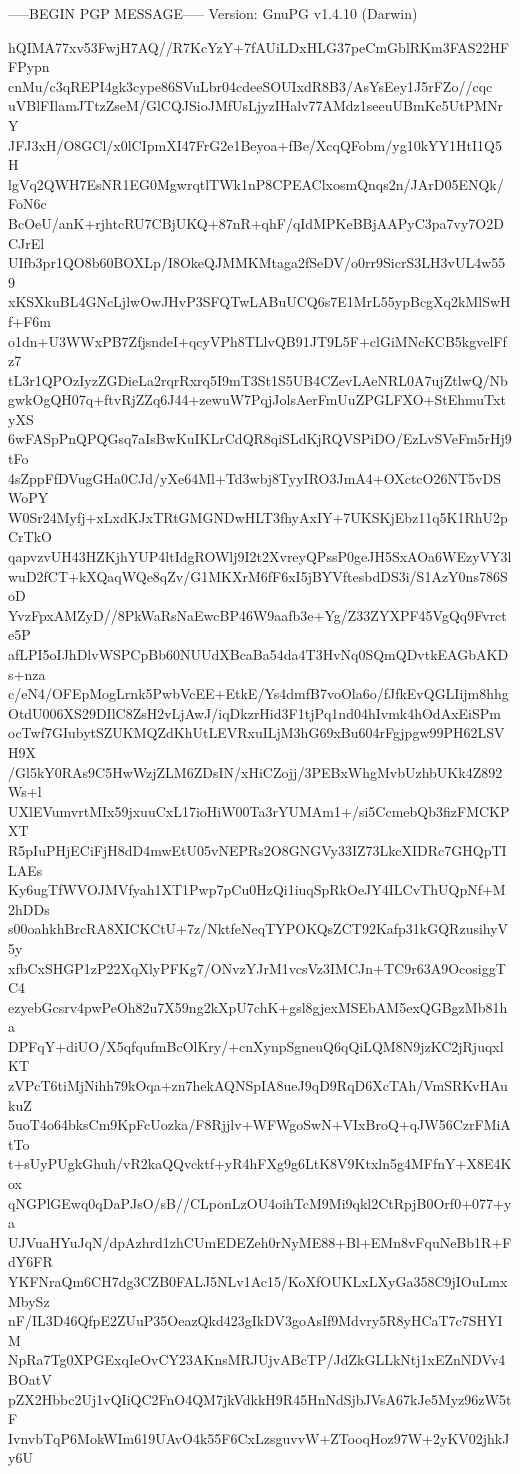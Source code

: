 -----BEGIN PGP MESSAGE-----
Version: GnuPG v1.4.10 (Darwin)

hQIMA77xv53FwjH7AQ//R7KcYzY+7fAUiLDxHLG37peCmGblRKm3FAS22HFFPypn
cnMu/c3qREPI4gk3cype86SVuLbr04cdeeSOUIxdR8B3/AsYsEey1J5rFZo//cqc
uVBlFIlamJTtzZseM/GlCQJSioJMfUsLjyzIHalv77AMdz1seeuUBmKc5UtPMNrY
JFJ3xH/O8GCl/x0lCIpmXI47FrG2e1Beyoa+fBe/XcqQFobm/yg10kYY1HtI1Q5H
lgVq2QWH7EsNR1EG0MgwrqtlTWk1nP8CPEAClxosmQnqs2n/JArD05ENQk/FoN6c
BcOeU/anK+rjhtcRU7CBjUKQ+87nR+qhF/qIdMPKeBBjAAPyC3pa7vy7O2DCJrEl
UIfb3pr1QO8b60BOXLp/I8OkeQJMMKMtaga2fSeDV/o0rr9SicrS3LH3vUL4w559
xKSXkuBL4GNcLjlwOwJHvP3SFQTwLABuUCQ6s7E1MrL55ypBcgXq2kMlSwHf+F6m
o1dn+U3WWxPB7ZfjsndeI+qcyVPh8TLlvQB91JT9L5F+clGiMNcKCB5kgvelFfz7
tL3r1QPOzIyzZGDieLa2rqrRxrq5I9mT3St1S5UB4CZevLAeNRL0A7ujZtlwQ/Nb
gwkOgQH07q+ftvRjZZq6J44+zewuW7PqjJolsAerFmUuZPGLFXO+StEhmuTxtyXS
6wFASpPnQPQGsq7aIsBwKuIKLrCdQR8qiSLdKjRQVSPiDO/EzLvSVeFm5rHj9tFo
4sZppFfDVugGHa0CJd/yXe64Ml+Td3wbj8TyyIRO3JmA4+OXctcO26NT5vDSWoPY
W0Sr24Myfj+xLxdKJxTRtGMGNDwHLT3fhyAxIY+7UKSKjEbz11q5K1RhU2pCrTkO
qapvzvUH43HZKjhYUP4ltIdgROWlj9I2t2XvreyQPssP0geJH5SxAOa6WEzyVY3l
wuD2fCT+kXQaqWQe8qZv/G1MKXrM6fF6xI5jBYVftesbdDS3i/S1AzY0ns786SoD
YvzFpxAMZyD//8PkWaRsNaEwcBP46W9aafb3e+Yg/Z33ZYXPF45VgQq9Fvrcte5P
afLPI5oIJhDlvWSPCpBb60NUUdXBcaBa54da4T3HvNq0SQmQDvtkEAGbAKDs+nza
c/eN4/OFEpMogLrnk5PwbVcEE+EtkE/Ys4dmfB7voOla6o/fJfkEvQGLIijm8hhg
OtdU006XS29DIlC8ZsH2vLjAwJ/iqDkzrHid3F1tjPq1nd04hIvmk4hOdAxEiSPm
ocTwf7GIubytSZUKMQZdKhUtLEVRxuILjM3hG69xBu604rFgjpgw99PH62LSVH9X
/Gl5kY0RAs9C5HwWzjZLM6ZDsIN/xHiCZojj/3PEBxWhgMvbUzhbUKk4Z892Ws+l
UXlEVumvrtMIx59jxuuCxL17ioHiW00Ta3rYUMAm1+/si5CcmebQb3fizFMCKPXT
R5pIuPHjECiFjH8dD4mwEtU05vNEPRs2O8GNGVy33IZ73LkcXIDRc7GHQpTILAEs
Ky6ugTfWVOJMVfyah1XT1Pwp7pCu0HzQi1iuqSpRkOeJY4ILCvThUQpNf+M2hDDs
s00oahkhBrcRA8XICKCtU+7z/NktfeNeqTYPOKQsZCT92Kafp31kGQRzusihyV5y
xfbCxSHGP1zP22XqXlyPFKg7/ONvzYJrM1vcsVz3IMCJn+TC9r63A9OcosiggTC4
ezyebGcsrv4pwPeOh82u7X59ng2kXpU7chK+gsl8gjexMSEbAM5exQGBgzMb81ha
DPFqY+diUO/X5qfqufmBcOlKry/+cnXynpSgneuQ6qQiLQM8N9jzKC2jRjuqxlKT
zVPcT6tiMjNihh79kOqa+zn7hekAQNSpIA8ueJ9qD9RqD6XcTAh/VmSRKvHAukuZ
5uoT4o64bksCm9KpFcUozka/F8Rjjlv+WFWgoSwN+VIxBroQ+qJW56CzrFMiAtTo
t+sUyPUgkGhuh/vR2kaQQvcktf+yR4hFXg9g6LtK8V9Ktxln5g4MFfnY+X8E4Kox
qNGPlGEwq0qDaPJsO/sB//CLponLzOU4oihTcM9Mi9qkl2CtRpjB0Orf0+077+ya
UJVuaHYuJqN/dpAzhrd1zhCUmEDEZeh0rNyME88+Bl+EMn8vFquNeBb1R+FdY6FR
YKFNraQm6CH7dg3CZB0FALJ5NLv1Ac15/KoXfOUKLxLXyGa358C9jIOuLmxMbySz
nF/IL3D46QfpE2ZUuP35OeazQkd423gIkDV3goAsIf9Mdvry5R8yHCaT7c7SHYIM
NpRa7Tg0XPGExqIeOvCY23AKnsMRJUjvABcTP/JdZkGLLkNtj1xEZnNDVv4BOatV
pZX2Hbbc2Uj1vQIiQC2FnO4QM7jkVdkkH9R45HnNdSjbJVsA67kJe5Myz96zW5tF
IvnvbTqP6MokWIm619UAvO4k55F6CxLzsguvvW+ZTooqHoz97W+2yKV02jhkJy6U
